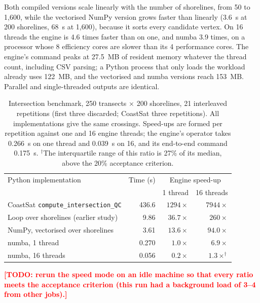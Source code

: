 \documentclass[authoryear,preprint,review,12pt]{elsarticle}
\newcommand{\todo}[1]{\textcolor{red}{\textbf{[TODO: #1]}}}
\begin{document}
Both compiled versions scale linearly with the number of shorelines, from 50
to 1,600, while the vectorised NumPy version grows faster than linearly
(3.6~s at 200 shorelines, 68~s at 1,600), because it sorts every candidate
vertex. On 16 threads the engine is 4.6 times faster than on one, and numba
3.9 times, on a processor whose 8 efficiency cores are slower than its 4
performance cores. The engine's command peaks at 27.5~MB of resident memory
whatever the thread count, including CSV parsing; a Python process that only
loads the workload already uses 122~MB, and the vectorised and numba versions
reach 153~MB. Parallel and single-threaded outputs are identical.

\begin{table}[t]
  \centering
  \small
  \caption{Intersection benchmark, 250 transects $\times$ 200 shorelines, 21
  interleaved repetitions (first three discarded; CoastSat three
  repetitions). All implementations give the same crossings. Speed-ups are
  formed per repetition against one and 16 engine threads; the engine's
  operator takes 0.266~s on one thread and 0.039~s on 16, and its end-to-end
  command 0.175~s. $^\dagger$The interquartile range of this ratio is 27\% of
  its median, above the 20\% acceptance criterion.}
  \label{tab:speed}
  \begin{tabular}{@{}lrrr@{}}
    \toprule
    Python implementation & Time (s) & \multicolumn{2}{c}{Engine speed-up} \\
                          &          & 1 thread & 16 threads \\
    \midrule
    CoastSat \texttt{compute\_intersection\_QC} & 436.6 & $1294\times$ & $7944\times$ \\
    Loop over shorelines (earlier study)        & 9.86  & $36.7\times$ & $260\times$ \\
    NumPy, vectorised over shorelines           & 3.61  & $13.6\times$ & $94.0\times$ \\
    numba, 1 thread                             & 0.270 & $1.0\times$  & $6.9\times$ \\
    numba, 16 threads                           & 0.056 & $0.2\times$  & $1.3\times^\dagger$ \\
    \bottomrule
  \end{tabular}
\end{table}
\todo{rerun the speed mode on an idle machine so that every ratio meets the
acceptance criterion (this run had a background load of 3--4 from other
jobs).}
\end{document}
